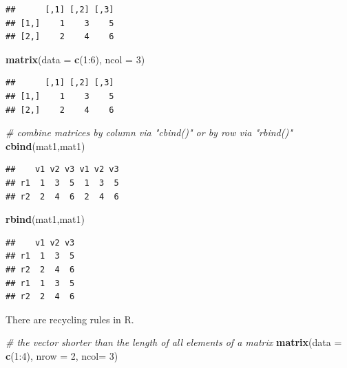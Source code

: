 \documentclass[]{book}
\newenvironment{Shaded}{\begin{snugshade}}{\end{snugshade}}
\newcommand{\KeywordTok}[1]{\textcolor[rgb]{0.13,0.29,0.53}{\textbf{{#1}}}}
\newcommand{\DataTypeTok}[1]{\textcolor[rgb]{0.13,0.29,0.53}{{#1}}}
\newcommand{\DecValTok}[1]{\textcolor[rgb]{0.00,0.00,0.81}{{#1}}}
\newcommand{\CommentTok}[1]{\textcolor[rgb]{0.56,0.35,0.01}{\textit{{#1}}}}
\newcommand{\NormalTok}[1]{{#1}}
\theoremstyle{definition}
\theoremstyle{definition}
\theoremstyle{remark}
\begin{document}
\begin{verbatim}
##      [,1] [,2] [,3]
## [1,]    1    3    5
## [2,]    2    4    6
\end{verbatim}

\begin{Shaded}
\begin{Highlighting}[]
\KeywordTok{matrix}\NormalTok{(}\DataTypeTok{data =} \KeywordTok{c}\NormalTok{(}\DecValTok{1}\NormalTok{:}\DecValTok{6}\NormalTok{), }\DataTypeTok{ncol =} \DecValTok{3}\NormalTok{)}
\end{Highlighting}
\end{Shaded}

\begin{verbatim}
##      [,1] [,2] [,3]
## [1,]    1    3    5
## [2,]    2    4    6
\end{verbatim}

\begin{Shaded}
\begin{Highlighting}[]
\CommentTok{# combine matrices by column via "cbind()" or by row via "rbind()"}
\KeywordTok{cbind}\NormalTok{(mat1,mat1)}
\end{Highlighting}
\end{Shaded}

\begin{verbatim}
##    v1 v2 v3 v1 v2 v3
## r1  1  3  5  1  3  5
## r2  2  4  6  2  4  6
\end{verbatim}

\begin{Shaded}
\begin{Highlighting}[]
\KeywordTok{rbind}\NormalTok{(mat1,mat1)}
\end{Highlighting}
\end{Shaded}

\begin{verbatim}
##    v1 v2 v3
## r1  1  3  5
## r2  2  4  6
## r1  1  3  5
## r2  2  4  6
\end{verbatim}

There are recycling rules in R.

\begin{Shaded}
\begin{Highlighting}[]
\CommentTok{# the vector shorter than the length of all elements of a matrix}
\KeywordTok{matrix}\NormalTok{(}\DataTypeTok{data =} \KeywordTok{c}\NormalTok{(}\DecValTok{1}\NormalTok{:}\DecValTok{4}\NormalTok{), }\DataTypeTok{nrow =} \DecValTok{2}\NormalTok{, }\DataTypeTok{ncol=} \DecValTok{3}\NormalTok{)}
\end{Highlighting}
\end{Shaded}
\end{document}
